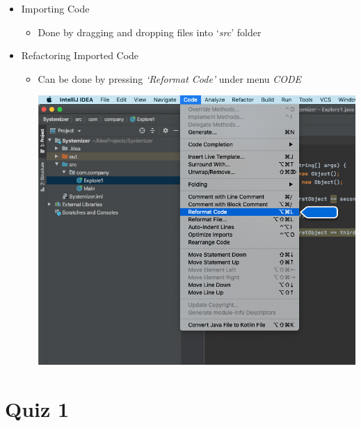 \documentclass[12pt]{article}
\begin{document}
\begin{itemize}
    \item Importing Code
    \begin{itemize}
        \item Done by dragging and dropping files into `\textit{src}' folder
    \end{itemize}

    \item Refactoring Imported Code
    \begin{itemize}
        \item Can be done by pressing \textit{`Reformat Code'} under menu \textit{CODE}

        \begin{center}
        \includegraphics[width=\linewidth]{images/part_2_notes_5.png}
        \end{center}
    \end{itemize}
\end{itemize}

\bigskip

\section{Quiz 1}

\bigskip
\end{document}
